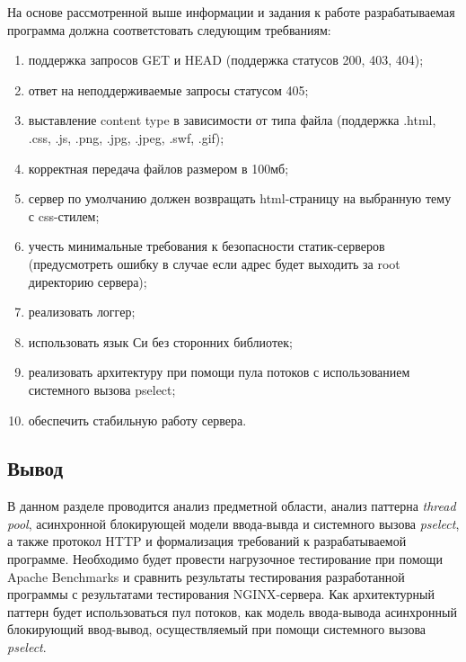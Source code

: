 На основе рассмотренной выше информации и задания к работе разрабатываемая программа должна соответстовать следующим требваниям:
\begin{enumerate}[label=\arabic*)]
	\item поддержка запросов GET и HEAD (поддержка статусов 200, 403, 404);
	\item ответ на неподдерживаемые запросы статусом 405;
	\item выставление content type в зависимости от типа файла (поддержка .html, .css, .js, .png, .jpg, .jpeg, .swf, .gif);
	\item корректная передача файлов размером в 100мб;
	\item сервер по умолчанию должен возвращать html-страницу на выбранную тему с css-стилем;
	\item учесть минимальные требования к безопасности статик-серверов (предусмотреть ошибку в случае если адрес будет выходить за root директорию сервера);
	\item реализовать логгер;
	\item использовать язык Си без сторонних библиотек;
	\item реализовать архитектуру при помощи пула потоков с использованием системного вызова pselect;
	\item обеспечить стабильную работу сервера.
\end{enumerate}


\subsection*{Вывод}

В данном разделе проводится анализ предметной области, анализ паттерна \textit{thread pool}, асинхронной блокирующей модели ввода-вывда и системного вызова \textit{pselect}, а также протокол HTTP и формализация требований к разрабатываемой программе.
Необходимо будет провести нагрузочное тестирование при помощи Apache Benchmarks и сравнить результаты тестирования разработанной программы с результатами тестирования NGINX-сервера.
Как архитектурный паттерн будет использоваться пул потоков, как модель ввода-вывода асинхронный блокирующий ввод-вывод, осуществляемый при помощи системного вызова \textit{pselect}.

